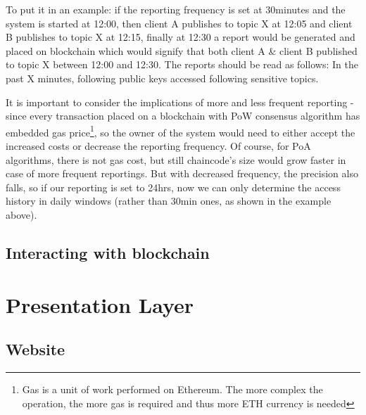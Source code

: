 To put it in an example: if the reporting frequency is set at 30minutes and the system is started at 12:00, then client A publishes to topic  X at 12:05 and client B publishes to topic X at 12:15, finally at 12:30 a report would be generated and placed on blockchain which would signify that both client A \& client B published to topic X between 12:00 and 12:30. The reports should be read as follows: In the past X minutes, following public keys accessed following sensitive topics. 

It is important to consider the implications of more and less frequent reporting - since every transaction placed on a blockchain with PoW consensus algorithm has embedded gas price\footnote{Gas is a unit of work performed on Ethereum. The more complex the operation, the more gas is required and thus more ETH currency is needed}, so the owner of the system would need to either accept the increased costs or decrease the reporting frequency. Of course, for PoA algorithms, there is not gas cost, but still chaincode's size would grow faster in case of more frequent reportings. But with decreased frequency, the precision also falls, so if our reporting is set to 24hrs, now we can only determine the access history in daily windows (rather than 30min ones, as shown in the example above).

\subsection{Interacting with blockchain}
\section{Presentation Layer}
\subsection{Website}
